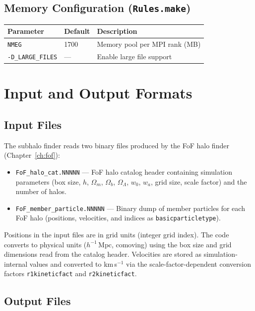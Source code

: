 \documentclass[11pt,fleqn]{book}
\newcommand{\code}[1]{\texttt{#1}}
\newcommand{\file}[1]{\texttt{#1}}
\newcommand{\flag}[1]{\texttt{-D#1}}
\begin{document}
\subsection{Memory Configuration (\file{Rules.make})}

\begin{longtable}{L{5cm} C{2cm} L{6.5cm}}
\toprule
\textbf{Parameter} & \textbf{Default} & \textbf{Description} \\
\midrule
\endhead
\code{NMEG}             & 1700  & Memory pool per MPI rank (MB) \\
\flag{\_LARGE\_FILES}   & ---   & Enable large file support \\
\bottomrule
\end{longtable}

\section{Input and Output Formats}

\subsection{Input Files}

The subhalo finder reads two binary files produced by the FoF halo finder (Chapter~\ref{ch:fof}):
\begin{itemize}[leftmargin=2em]
  \item \file{FoF\_halo\_cat.NNNNN} --- FoF halo catalog header containing simulation parameters (box size, $h$, $\Omega_m$, $\Omega_b$, $\Omega_\Lambda$, $w_0$, $w_a$, grid size, scale factor) and the number of halos.
  \item \file{FoF\_member\_particle.NNNNN} --- Binary dump of member particles for each FoF halo (positions, velocities, and indices as \code{basicparticletype}).
\end{itemize}

\begin{remark}
Positions in the input files are in grid units (integer grid index).  The code converts to physical units ($h^{-1}\,\text{Mpc}$, comoving) using the box size and grid dimensions read from the catalog header.  Velocities are stored as simulation-internal values and converted to km\,s$^{-1}$ via the scale-factor-dependent conversion factors \code{r1kineticfact} and \code{r2kineticfact}.
\end{remark}

\subsection{Output Files}
\end{document}
